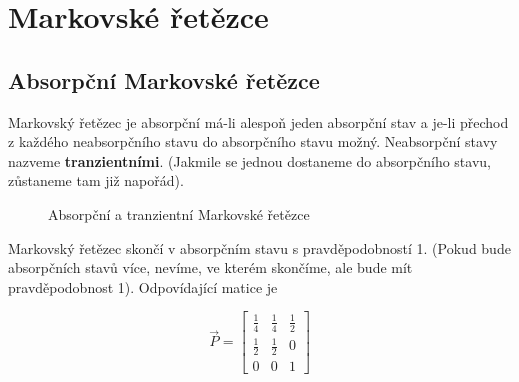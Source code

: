\chapter{Markovské řetězce}
\section{Absorpční Markovské řetězce}
Markovský řetězec je absorpční má-li alespoň jeden absorpční stav a je-li přechod z každého neabsorpčního stavu do absorpčního stavu možný. Neabsorpční stavy nazveme \textbf{tranzientními}. (Jakmile se jednou dostaneme do absorpčního stavu, zůstaneme tam již napořád).

\begin{figure}

\caption{Absorpční a tranzientní Markovské řetězce}
\end{figure}

Markovský řetězec skončí v absorpčním stavu s pravděpodobností 1. (Pokud bude absorpčních stavů více, nevíme, ve kterém skončíme, ale bude mít pravděpodobnost 1). Odpovídající matice je

\[ \vec{P} = 
\begin{bmatrix}
\frac{1}{4} & \frac{1}{4} & \frac{1}{2}\\
\frac{1}{2} & \frac{1}{2} & 0\\
0 & 0 & 1
\end{bmatrix}
\]

